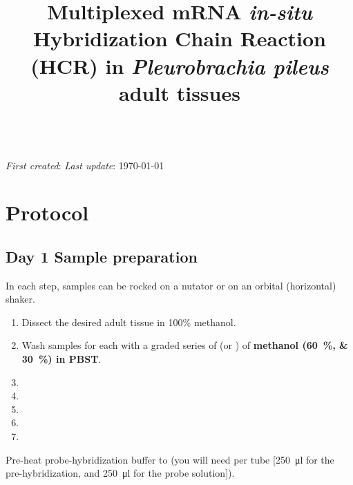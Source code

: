 \documentclass[10pt]{report}
\makeatletter
\renewcommand\maketitle{
{\begin{center}
{\Large \bfseries \@title }\\
{\small \emph{First created}: \DTMdisplaydate{2025}{03}{25}{-1}\hfill%
\setstretch{1.0} \small \hfill \emph{Last update}: \today}
\end{center}}} %
\makeatother
\begin{document}

\title{\vspace{-3em} Multiplexed mRNA \textit{in-situ} Hybridization Chain Reaction (HCR) in \emph{Pleurobrachia pileus} adult tissues}
\maketitle
\thispagestyle{plain}

\section*{\vspace{-1em} \textendash{} Protocol \textendash{}}

\subsection*{Day 1 \textendash{} Sample preparation}

\alert{In each step, samples can be rocked on a nutator or on an orbital (horizontal) shaker.}

\begin{enumerate}[series = steps]
	\item Dissect the desired adult tissue in 100\% methanol.
	\item Wash samples for \underline{\quarter} each with a graded series of \fivehunmicrol{} (or \onemil) of \textbf{methanol (\qtylist{60;30}{\percent}) in PBST}.
	\item {}
	\item {}
	\item {}
	\item {}
	\item {}
\end{enumerate}

\bigskip\alert{Pre-heat probe-hybridization buffer to \thirtysevendegree{} (you will need \fivehunmicrol per tube [\qty{250}{\ul} for the pre-hybridization, and \qty{250}{\ul} for the probe solution]).}
	
\end{document}
